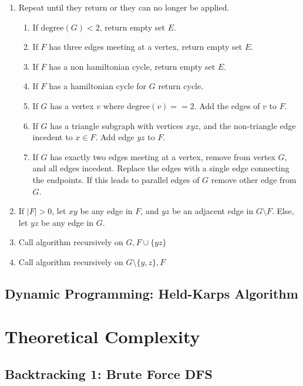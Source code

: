 \begin{enumerate}
    \item Repeat until they return or they can no longer be applied.
    \begin{enumerate}
        \item If $\text{degree}(G) < 2$, return empty set $E$.
        \item If $F$ has three edges meeting at a vertex, return empty set $E$.
        \item If $F$ has a non hamiltonian cycle, return empty set $E$.
        \item If $F$ has a hamiltonian cycle for $G$ return cycle.
        \item If $G$ has a vertex $v$ where $\text{degree}(v) == 2$. Add the
            edges of $v$ to $F$.
        \item If $G$ has a triangle subgraph with vertices $xyz$, and the
            non-triangle edge incedent to $x \in F$. Add edge $yz$ to $F$.
        \item If $G$ has exactly two edges meeting at a vertex, remove from
            vertex $G$, and all edges incedent. Replace the edges with a single
            edge connecting the endpoints. If this leads to parallel edges of
            $G$ remove other edge from $G$.
    \end{enumerate}
    \item If $|F| > 0$, let $xy$ be any edge in $F$, and $yz$ be an adjacent
        edge in $G \setminus F$. Else, let $yz$ be any edge in $G$.
    \item Call algorithm recursively on $G, F \cup \{yz\}$
    \item Call algorithm recursively on $G \setminus \{y,z\}, F$
\end{enumerate}

\subsection{Dynamic Programming: Held-Karps Algorithm}

\newpage

\section{Theoretical Complexity}

\subsection{Backtracking 1: Brute Force DFS}

